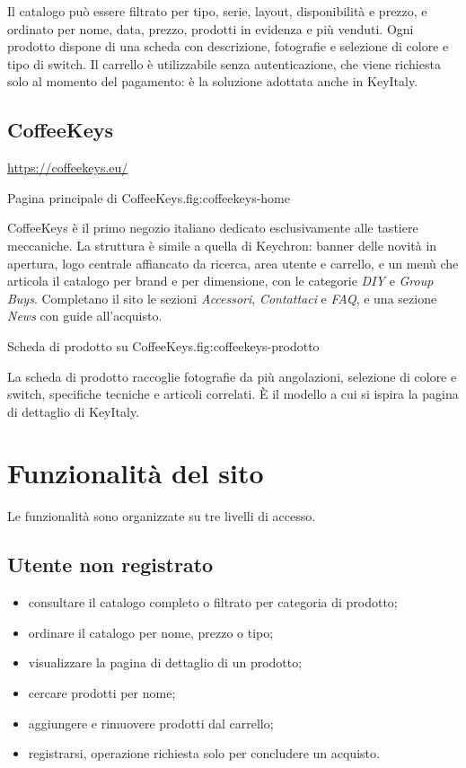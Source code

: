 \documentclass[11pt,a4paper]{article}
\begin{document}
Il catalogo può essere filtrato per tipo, serie, layout, disponibilità e prezzo,
e ordinato per nome, data, prezzo, prodotti in evidenza e più venduti. Ogni
prodotto dispone di una scheda con descrizione, fotografie e selezione di
colore e tipo di switch. Il carrello è utilizzabile senza autenticazione, che
viene richiesta solo al momento del pagamento: è la soluzione adottata anche in
KeyItaly.

\subsection{CoffeeKeys}

\noindent\url{https://coffeekeys.eu/}

  {Pagina principale di CoffeeKeys.}{fig:coffeekeys-home}

CoffeeKeys è il primo negozio italiano dedicato esclusivamente alle tastiere
meccaniche. La struttura è simile a quella di Keychron: banner delle novità in
apertura, logo centrale affiancato da ricerca, area utente e carrello, e un menù
che articola il catalogo per brand e per dimensione, con le categorie
\emph{DIY} e \emph{Group Buys}. Completano il sito le sezioni
\emph{Accessori}, \emph{Contattaci} e \emph{FAQ}, e una sezione \emph{News} con
guide all'acquisto.

  {Scheda di prodotto su CoffeeKeys.}{fig:coffeekeys-prodotto}

La scheda di prodotto raccoglie fotografie da più angolazioni, selezione di
colore e switch, specifiche tecniche e articoli correlati. È il modello a cui si
ispira la pagina di dettaglio di KeyItaly.

\section{Funzionalità del sito}

Le funzionalità sono organizzate su tre livelli di accesso.

\subsection{Utente non registrato}

\begin{itemize}
  \item consultare il catalogo completo o filtrato per categoria di prodotto;
  \item ordinare il catalogo per nome, prezzo o tipo;
  \item visualizzare la pagina di dettaglio di un prodotto;
  \item cercare prodotti per nome;
  \item aggiungere e rimuovere prodotti dal carrello;
  \item registrarsi, operazione richiesta solo per concludere un acquisto.
\end{itemize}
\end{document}
